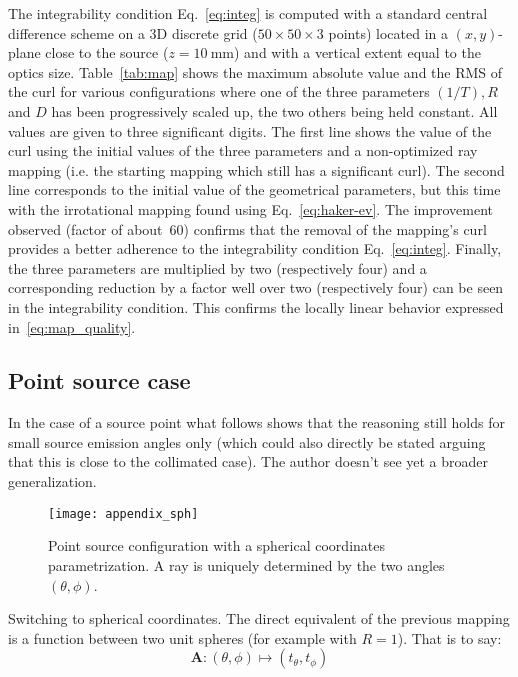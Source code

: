 The integrability condition Eq.~\eqref{eq:integ} is computed with a
standard central difference scheme on a 3D discrete grid ($50\times 50
\times 3$ points) located in a $(x,y)$-plane close to the source
($z=10\mathrm{~mm}$) and with a vertical extent equal to the optics
size. Table~\ref{tab:map} shows the maximum absolute value and the RMS
of the curl for various configurations where one of the three parameters
$(1/T), R$ and $D$ has been progressively scaled up, the two others being 
held constant. All values are
given to three significant digits. The first line shows the value of
the curl using the initial values of the three parameters and a
non-optimized ray mapping (i.e. the starting mapping which still has a
significant curl). The second line corresponds to the initial value of
the geometrical parameters, but this time with the irrotational
mapping found using Eq.~\ref{eq:haker-ev}.  The improvement observed
(factor of about~60) confirms that the removal of the mapping's curl
provides a better adherence to the integrability condition
Eq.~\eqref{eq:integ}.  Finally, the three parameters are multiplied by
two (respectively four) and a corresponding reduction by a factor well
over two (respectively four) can be seen in the integrability
condition. This confirms the locally linear behavior expressed
in~\eqref{eq:map_quality}.


\subsection{Point source case}

In the case of a source point what follows shows that the reasoning still holds for  
small source emission angles only (which could also directly be stated
arguing  that this is close to the collimated case).
The author doesn't see yet a broader generalization.

\begin{figure}[!htbp]
  \centering \texttt{[image: appendix\_sph]}
  \caption{Point source configuration with a spherical
  coordinates parametrization. A ray is uniquely determined by the two angles $(\theta, \phi)$.  
  }
  \label{fig:appendix_sph}
\end{figure}

Switching to spherical coordinates.
The direct equivalent of the previous mapping is a function between
 two unit spheres (for example with $R=1$). That
is to say:
\[ \mathbf{A} : (\theta,\phi) \mapsto (t_\theta, t_\phi)\]

